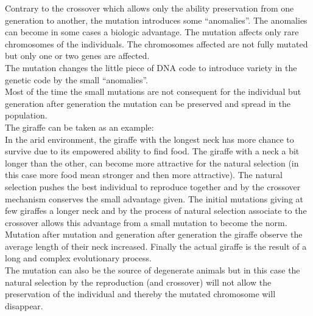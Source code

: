 Contrary to the crossover which allows only the ability preservation from one generation to another, the mutation introduces some “anomalies”. The anomalies can become in some cases a biologic advantage.
The mutation affects only rare chromosomes of the individuals. The chromosomes affected are not fully mutated but only one or two genes are affected. \\
The mutation changes the little piece of DNA code to introduce variety in the genetic code by the small “anomalies”.\\
Most of the time the small mutations are not consequent for the individual but generation after generation the mutation can be preserved and spread in the population. \\  



The giraffe can be taken as an example:\\
 In the arid environment, the giraffe with the longest neck has more chance to survive due to its empowered ability to find food. The giraffe with a neck a bit longer than the other, can become more attractive for the natural selection (in this case more food mean stronger and then more attractive). The natural selection pushes the best individual to reproduce together and by the crossover mechanism conserves the small advantage given. The initial mutations giving at few giraffes a longer neck and by the process of natural selection associate to the crossover allows this advantage from a small mutation to become the norm. Mutation after mutation and generation after generation the giraffe  observe the average length of their neck increased. Finally the actual giraffe is the result of a long and complex evolutionary process. \\ 
The mutation can also be the source of degenerate animals but in this case the natural selection  by the reproduction (and crossover) will not allow the preservation of the individual and thereby the mutated chromosome will disappear.\\ 
